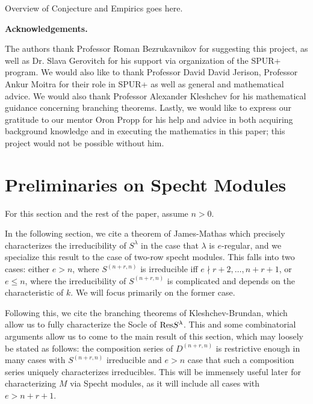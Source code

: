 \documentclass{amsart}
\newcommand{\fakesubsection}[1]{
    \vspace{7pt}
    \noindent \textbf{#1.}
  }
\begin{document}
  {\color{orange} Overview of Conjecture and Empirics goes here.}

  \fakesubsection{Acknowledgements}
  The authors thank Professor Roman Bezrukavnikov for suggesting this project, as well as Dr. Slava Gerovitch for his support via organization of the SPUR+ program.
  We would also like to thank Professor David David Jerison, Professor Ankur Moitra for their role in SPUR+ as well as general and mathematical advice.
  We would also thank Professor Alexander Kleshchev for his mathematical guidance concerning branching theorems.
  Lastly, we would like to express our gratitude to our mentor Oron Propp for his help and advice in both acquiring background knowledge and in executing the mathematics in this paper;
  this project would not be possible without him.

  \newpage
   
\section{Preliminaries on Specht Modules}\label{Specht Modules Section}
  For this section and the rest of the paper, assume $n > 0$.

  In the following section, we cite a theorem of James-Mathas which precisely characterizes the irreducibility of $S^\lambda$ in the case that $\lambda$ is $e$-regular, and we specialize this result to the case of two-row specht modules.
  This falls into two cases: either $e > n$, where $S^{(n+r,n)}$ is irreducible iff $e \nmid r+2,\dots,n+r+1$, or $e \leq n$, where the irreducibility of $S^{(n+r,n)}$ is complicated and depends on the characteristic of $k$.
  We will focus primarily on the former case.

  Following this, we cite the branching theorems of Kleshchev-Brundan, which allow us to fully characterize the Socle of $\text{Res} S^{\lambda}$.
  This and some combinatorial arguments allow us to come to the main result of this section, which may loosely be stated as follows:
  the composition series of $D^{(n+r,n)}$ is restrictive enough in many cases with $S^{(n+r,n)}$ irreducible and $e > n$ case that such a composition series uniquely characterizes irreducibles.
  This will be immensely useful later for characterizing $M$ via Specht modules, as it will include all cases with $e > n + r + 1$.
\end{document}
